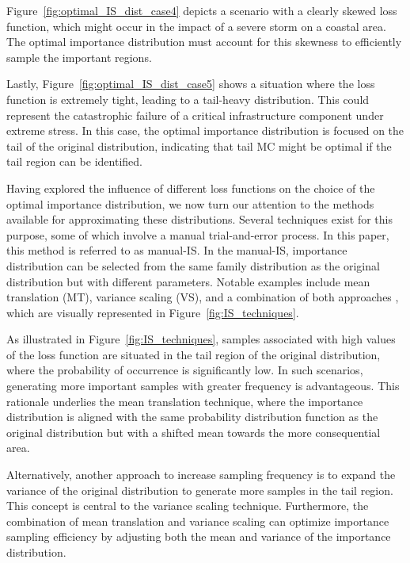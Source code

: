         

        Figure~\ref{fig:optimal_IS_dist_case4} depicts a scenario with a clearly skewed loss function, which might occur in the impact of a severe storm on a coastal area. The optimal importance distribution must account for this skewness to efficiently sample the important regions.

        
        
        Lastly, Figure~\ref{fig:optimal_IS_dist_case5} shows a situation where the loss function is extremely tight, leading to a tail-heavy distribution. This could represent the catastrophic failure of a critical infrastructure component under extreme stress. In this case, the optimal importance distribution is focused on the tail of the original distribution, indicating that tail MC might be optimal if the tail region can be identified.
        
        Having explored the influence of different loss functions on the choice of the optimal importance distribution, we now turn our attention to the methods available for approximating these distributions. Several techniques exist for this purpose, some of which involve a manual trial-and-error process. In this paper, this method is referred to as manual-IS. In the manual-IS, importance distribution can be selected from the same family distribution as the original distribution but with different parameters. Notable examples include mean translation (MT), variance scaling (VS), and a combination of both approaches \cite{lu_improved_1988}, which are visually represented in Figure~\ref{fig:IS_techniques}.    
        
        
        As illustrated in Figure~\ref{fig:IS_techniques}, samples associated with high values of the loss function are situated in the tail region of the original distribution, where the probability of occurrence is significantly low. In such scenarios, generating more important samples with greater frequency is advantageous. This rationale underlies the mean translation technique, where the importance distribution is aligned with the same probability distribution function as the original distribution but with a shifted mean towards the more consequential area.
        
        Alternatively, another approach to increase sampling frequency is to expand the variance of the original distribution to generate more samples in the tail region. This concept is central to the variance scaling technique. Furthermore, the combination of mean translation and variance scaling can optimize importance sampling efficiency by adjusting both the mean and variance of the importance distribution.
        
